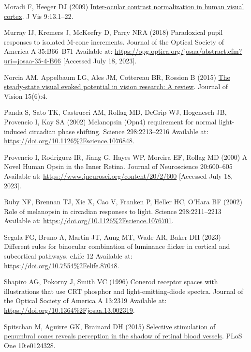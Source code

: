 \documentclass[
]{article}
\newlength{\cslhangindent}
\newenvironment{CSLReferences}[2] %
 {\begin{list}{}{%
  \setlength{\itemindent}{0pt}
  \setlength{\leftmargin}{0pt}
  \setlength{\parsep}{0pt}
  \ifodd #1
   \setlength{\leftmargin}{\cslhangindent}
   \setlength{\itemindent}{-1\cslhangindent}
  \fi
  \setlength{\itemsep}{#2\baselineskip}}}
 {\end{list}}
\begin{document}
\begin{CSLReferences}{1}{1}
Moradi F, Heeger DJ (2009) \href{https://doi.org/10.1167/9.3.13}{Inter-ocular contrast normalization in human visual cortex}. J Vis 9:13.1--22.

Murray IJ, Kremers J, McKeefry D, Parry NRA (2018) Paradoxical pupil responses to isolated {M}-cone increments. Journal of the Optical Society of America A 35:B66--B71 Available at: \url{https://opg.optica.org/josaa/abstract.cfm?uri=josaa-35-4-B66} {[}Accessed July 18, 2023{]}.

Norcia AM, Appelbaum LG, Ales JM, Cottereau BR, Rossion B (2015) \href{https://doi.org/10.1167/15.6.4}{The steady-state visual evoked potential in vision research: A review}. Journal of Vision 15(6):4.

Panda S, Sato TK, Castrucci AM, Rollag MD, DeGrip WJ, Hogenesch JB, Provencio I, Kay SA (2002) Melanopsin (Opn4) requirement for normal light-induced circadian phase shifting. Science 298:2213--2216 Available at: \url{https://doi.org/10.1126\%2Fscience.1076848}.

Provencio I, Rodriguez IR, Jiang G, Hayes WP, Moreira EF, Rollag MD (2000) A {Novel} {Human} {Opsin} in the {Inner} {Retina}. Journal of Neuroscience 20:600--605 Available at: \url{https://www.jneurosci.org/content/20/2/600} {[}Accessed July 18, 2023{]}.

Ruby NF, Brennan TJ, Xie X, Cao V, Franken P, Heller HC, O'Hara BF (2002) Role of melanopsin in circadian responses to light. Science 298:2211--2213 Available at: \url{https://doi.org/10.1126\%2Fscience.1076701}.

Segala FG, Bruno A, Martin JT, Aung MT, Wade AR, Baker DH (2023) Different rules for binocular combination of luminance flicker in cortical and subcortical pathways. eLife 12 Available at: \url{https://doi.org/10.7554\%2Felife.87048}.

Shapiro AG, Pokorny J, Smith VC (1996) Cone{\textendash}rod receptor spaces with illustrations that use {CRT} phosphor and light-emitting-diode spectra. Journal of the Optical Society of America A 13:2319 Available at: \url{https://doi.org/10.1364\%2Fjosaa.13.002319}.

Spitschan M, Aguirre GK, Brainard DH (2015) \href{https://doi.org/10.1371/journal.pone.0124328}{Selective stimulation of penumbral cones reveals perception in the shadow of retinal blood vessels}. PLoS One 10:e0124328.


\end{CSLReferences}
\end{document}
